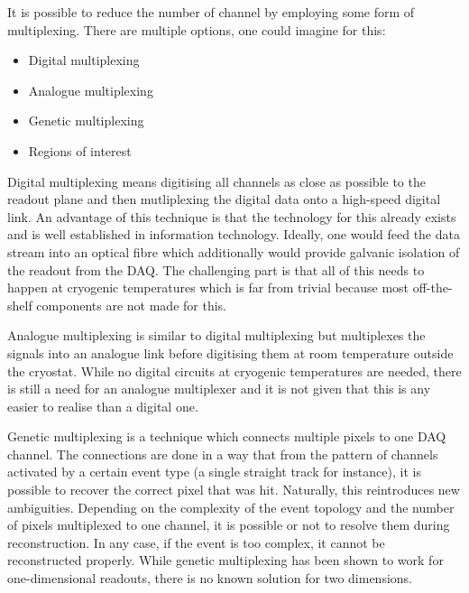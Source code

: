 It is possible to reduce the number of channel by employing some form of multiplexing.
There are multiple options, one could imagine for this:
\begin{itemize}
	\item Digital multiplexing
	\item Analogue multiplexing
	\item Genetic multiplexing
	\item Regions of interest
\end{itemize}

Digital multiplexing means digitising all channels as close as possible to the readout plane and then mutliplexing the digital data onto a high-speed digital link.
An advantage of this technique is that the technology for this already exists and is well established in information technology.
Ideally, one would feed the data stream into an optical fibre which additionally would provide galvanic isolation of the readout from the DAQ.
The challenging part is that all of this needs to happen at cryogenic temperatures which is far from trivial because most off-the-shelf components are not made for this.

Analogue multiplexing is similar to digital multiplexing but multiplexes the signals into an analogue link before digitising them at room temperature outside the cryostat.
While no digital circuits at cryogenic temperatures are needed, there is still a need for an analogue multiplexer and it is not given that this is any easier to realise than a digital one.

Genetic multiplexing is a technique which connects multiple pixels to one DAQ channel.
The connections are done in a way that from the pattern of channels activated by a certain event type (a single straight track for instance), it is possible to recover the correct pixel that was hit.
Naturally, this reintroduces new ambiguities.
Depending on the complexity of the event topology and the number of pixels multiplexed to one channel, it is possible or not to resolve them during reconstruction.
In any case, if the event is too complex, it cannot be reconstructed properly.
While genetic multiplexing has been shown to work for one-dimensional readouts, there is no known solution for two dimensions. %

